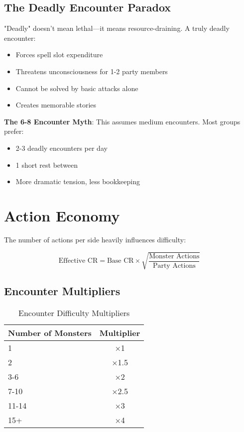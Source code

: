 \documentclass[11pt,letterpaper,openany]{book}
\begin{document}
\subsection{The Deadly Encounter Paradox}

"Deadly" doesn't mean lethal—it means resource-draining. A truly deadly encounter:
\begin{itemize}
    \item Forces spell slot expenditure
    \item Threatens unconsciousness for 1-2 party members
    \item Cannot be solved by basic attacks alone
    \item Creates memorable stories
\end{itemize}

\textbf{The 6-8 Encounter Myth}: This assumes medium encounters. Most groups prefer:
\begin{itemize}
    \item 2-3 deadly encounters per day
    \item 1 short rest between
    \item More dramatic tension, less bookkeeping
\end{itemize}

\section{Action Economy}

The number of actions per side heavily influences difficulty:

\begin{equation}
\text{Effective CR} = \text{Base CR} \times \sqrt{\frac{\text{Monster Actions}}{\text{Party Actions}}}
\end{equation}

\subsection{Encounter Multipliers}

\begin{table}[h]
\centering
\begin{tabular}{@{}lc@{}}
\toprule
\textbf{Number of Monsters} & \textbf{Multiplier} \\
\midrule
1 & ×1 \\
2 & ×1.5 \\
3-6 & ×2 \\
7-10 & ×2.5 \\
11-14 & ×3 \\
15+ & ×4 \\
\bottomrule
\end{tabular}
\caption{Encounter Difficulty Multipliers}
\end{table}
\end{document}
